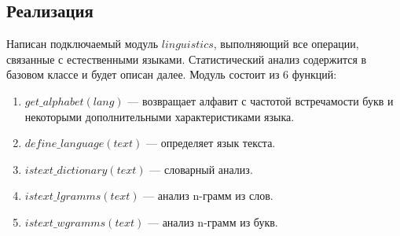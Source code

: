 \subsection{Реализация}
Написан подключаемый модуль $linguistics$, выполняющий все операции, 
связанные с естественными языками. Статистический анализ
содержится в базовом классе и будет описан далее.
Модуль состоит из 6 функций:

\begin{enumerate}
\item $get\_alphabet(lang)$ — возвращает алфавит с частотой встречамости 
    букв и некоторыми дополнительными характеристиками языка.
\item $define\_language(text)$ — определяет язык текста.
\item $istext\_dictionary(text)$ — словарный анализ.
\item $istext\_lgramms(text)$ — анализ n-грамм из слов.
\item $istext\_wgramms(text)$ — анализ n-грамм из букв.
\end{enumerate}
